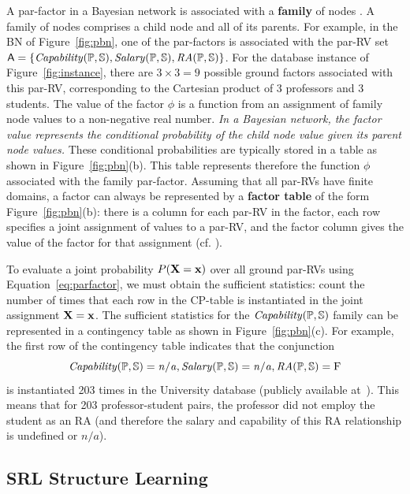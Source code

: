 A par-factor in a Bayesian network is associated with a \textbf{family} of nodes \cite[Sec.2.2.1]{Kimmig2015}. A family of nodes comprises a child node and all of its parents. For example, in the BN of Figure~\ref{fig:pbn}, one of the par-factors is associated with the par-RV set $\parrvs=\{\it{Capability}(\P,\S),\it{Salary}(\P,\S),\it{RA}(\P,\S)\}$. For the database instance of Figure~\ref{fig:instance}, there are $3\times3=9$ possible ground factors associated with this par-RV, corresponding to the Cartesian product of 3 professors and 3 students. The value of the factor $\phi$ is a function from an assignment of family node values to a non-negative real number. {\em In a Bayesian network, the factor value represents the conditional probability of the child node value given its parent node values.} These conditional probabilities are typically stored in a table as shown in Figure~\ref{fig:pbn}(b). This table represents therefore the function $\phi$ associated with the family par-factor. Assuming that all par-RVs have finite domains, a factor can always be represented by a \textbf{factor table} of the form Figure~\ref{fig:pbn}(b): there is a column for each par-RV in the factor, each row specifies a joint assignment of values to a par-RV, and the factor column gives the value of the factor for that assignment (cf. \cite[Sec.2.2.1]{Kimmig2015}).


To evaluate a joint probability $P(\set{X}=\set{x})$ over all ground par-RVs using Equation~\ref{eq:parfactor}, we must obtain the sufficient statistics: count the number of times that each row in the CP-table is instantiated in the joint assignment $\set{X}=\set{x}$. 
The sufficient statistics for the $\it{Capability}(\P,\S)$ family can be represented in a contingency table as shown in Figure~\ref{fig:pbn}(c). For example, the first row of the contingency table indicates that the conjunction $$\it{Capability}(\P,\S)=n/a,\it{Salary}(\P,\S)=n/a,\it{RA}(\P,\S) =\false$$ is instantiated 203 times in the University database (publicly available at~\cite{bib:bbsite}). This means that for 203 professor-student pairs, the professor did not employ the student as an RA (and therefore the salary and capability of this RA relationship is undefined or $n/a$).

\subsection{SRL Structure Learning}

